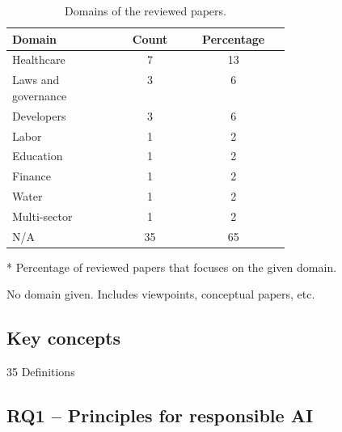 \begin{table}[htpb]
    \centering
    \caption{Domains of the reviewed papers.}
    \label{tab:summary-domain}
    \begin{threeparttable}
    \begin{tabular}{p{0.4\linewidth}cc}
    \toprule
        \textbf{Domain} & \textbf{Count} & \textbf{Percentage}\tnote{*} \\
    \midrule
        Healthcare              & 7     & 13 \\ 
        Laws and governance     & 3     & 6 \\
        Developers              & 3     & 6 \\
        Labor                   & 1     & 2 \\
        Education               & 1     & 2 \\
        Finance                 & 1     & 2 \\
        Water                   & 1     & 2 \\
        Multi-sector            & 1     & 2 \\
        N/A\tnote{\textdagger}  & 35    & 65 \\ 
    \bottomrule
    \end{tabular}
    \begin{tablenotes}
        \footnotesize
        \item [*] Percentage of reviewed papers that focuses on the given domain.
        \item [\textdagger] No domain given. Includes viewpoints, conceptual papers, etc.
    \end{tablenotes}
\end{threeparttable}
\end{table}





\subsection{Key concepts}
{35 Definitions}


\subsection{RQ1 -- Principles for responsible AI}
\label{sec:results-rq1}

